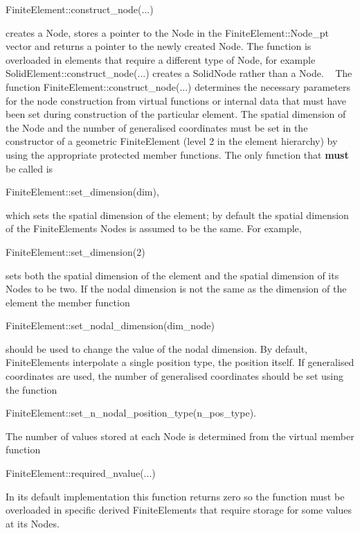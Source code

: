 \begin{DoxyItemize}
\begin{DoxyItemize}
\begin{DoxyCode}
FiniteElement::construct\_node(...) 
\end{DoxyCode}
 creates a {\ttfamily Node}, stores a pointer to the {\ttfamily Node} in the {\ttfamily Finite\+Element\+::\+Node\+\_\+pt} vector and returns a pointer to the newly created {\ttfamily Node}. The function is overloaded in elements that require a different type of {\ttfamily Node}, for example {\ttfamily Solid\+Element\+::construct\+\_\+node}(...) creates a {\ttfamily Solid\+Node} rather than a {\ttfamily Node}. ~\newline
 The function {\ttfamily Finite\+Element\+::construct\+\_\+node}(...) determines the necessary parameters for the node construction from virtual functions or internal data that must have been set during construction of the particular element. \label{index_set_commands}%
%
 The spatial dimension of the {\ttfamily Node} and the number of generalised coordinates must be set in the constructor of a geometric {\ttfamily Finite\+Element} (level 2 in the element hierarchy) by using the appropriate protected member functions. The only function that {\bfseries must} be called is 
\begin{DoxyCode}
FiniteElement::set\_dimension(dim), 
\end{DoxyCode}
 which sets the spatial dimension of the element; by default the spatial dimension of the {\ttfamily Finite\+Element\textquotesingle{}s} {\ttfamily Nodes} is assumed to be the same. For example, 
\begin{DoxyCode}
FiniteElement::set\_dimension(2) 
\end{DoxyCode}
 sets both the spatial dimension of the element and the spatial dimension of its {\ttfamily Nodes} to be two. If the nodal dimension is not the same as the dimension of the element the member function 
\begin{DoxyCode}
FiniteElement::set\_nodal\_dimension(dim\_node) 
\end{DoxyCode}
 should be used to change the value of the nodal dimension. By default, {\ttfamily Finite\+Elements} interpolate a single position type, the position itself. If generalised coordinates are used, the number of generalised coordinates should be set using the function 
\begin{DoxyCode}
FiniteElement::set\_n\_nodal\_position\_type(n\_pos\_type). 
\end{DoxyCode}
 The number of values stored at each {\ttfamily Node} is determined from the virtual member function 
\begin{DoxyCode}
FiniteElement::required\_nvalue(...)  
\end{DoxyCode}
 In its default implementation this function returns zero so the function must be overloaded in specific derived {\ttfamily Finite\+Elements} that require storage for some values at its {\ttfamily Nodes}.


\end{DoxyItemize}
\end{DoxyItemize}
